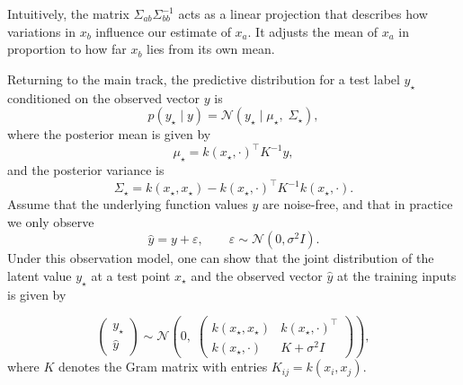 \documentclass[../main]{subfiles}
\begin{document}
\begin{remark}
    Intuitively, the matrix $\Sigma_{ab}\Sigma_{bb}^{-1}$ acts as a linear
    projection that describes how variations in $x_b$ influence our estimate
    of $x_a$.  
    It adjusts the mean of $x_a$ in proportion to how far $x_b$ lies from its
    own mean.
\end{remark}
Returning to the main track, the predictive distribution for a test label
$y_\star$ conditioned on the observed vector $y$ is
\begin{equation}
    p(y_\star \mid y)
    =
    \mathcal N\!\left(
        y_\star \mid \mu_\star,\; \Sigma_\star
    \right),
\end{equation}
where the posterior mean is given by
\begin{equation}
    \mu_\star
    =
    k(x_\star,\cdot)^\top K^{-1} y,
\end{equation}
and the posterior variance is
\begin{equation}
    \Sigma_\star
    =
    k(x_\star,x_\star)
    - k(x_\star,\cdot)^\top K^{-1} k(x_\star,\cdot).
\end{equation}
Assume that the underlying function values $y$ are noise-free, and that in
practice we only observe
\begin{equation}
    \hat y = y + \varepsilon,
    \qquad 
    \varepsilon \sim \mathcal{N}(0,\sigma^{2}I).
\end{equation}
Under this observation model, one can show that the joint distribution of the
latent value $y_\star$ at a test point $x_\star$ and the observed vector $\hat y$
at the training inputs is given by
\begin{theorem}
    \begin{equation}
        \begin{pmatrix}
            y_\star \\[4pt]
            \hat y
        \end{pmatrix}
        \sim
        \mathcal{N}\!\left(
            0,\;
            \begin{pmatrix}
                k(x_\star,x_\star) & k(x_\star,\cdot)^\top \\
                k(x_\star,\cdot)   & K + \sigma^{2} I
            \end{pmatrix}
        \right),
    \end{equation}
    where $K$ denotes the Gram matrix with entries $K_{ij} = k(x_i,x_j)$.
\end{theorem}
\end{document}
